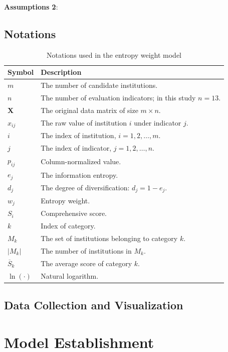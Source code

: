 \documentclass{mcmthesis}
\begin{document}
\textbf{Assumptions 2}: 

\subsection{Notations}
\begin{table}[!htbp]
\centering
\caption{Notations used in the entropy weight model}
\renewcommand{\arraystretch}{1.2} %
\begin{tabular}{p{} p{}}
\hline
\textbf{Symbol} & \textbf{Description} \\
\hline
$m$ & The number of candidate institutions. \\
$n$ & The number of evaluation indicators; in this study $n=13$. \\
$\mathbf{X}$ & The original data matrix of size $m\times n$. \\
$x_{ij}$ & The raw value of institution $i$ under indicator $j$. \\
$i$ & The index of institution, $i=1,2,\ldots,m$. \\
$j$ & The index of indicator, $j=1,2,\ldots,n$. \\
$p_{ij}$ & Column-normalized value. \\
$e_j$ & The information entropy. \\
$d_j$ & The degree of diversification: $d_j=1-e_j$. \\
$w_j$ & Entropy weight. \\
$S_i$ & Comprehensive score. \\
$k$ & Index of category. \\
$M_k$ & The set of institutions belonging to category $k$. \\
$|M_k|$ & The number of institutions in $M_k$. \\
$\overline{S}_k$ & The average score of category $k$. \\
$\ln(\cdot)$ & Natural logarithm. \\
\hline
\end{tabular}
\renewcommand{\arraystretch}{1.0} %
\end{table}




\subsection{Data Collection and Visualization}


\section{Model Establishment}
\end{document}
